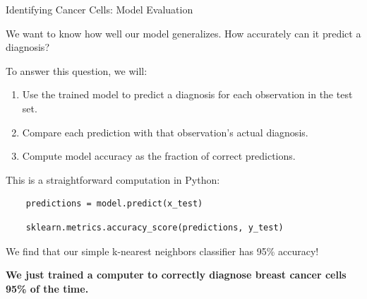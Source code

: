 \documentclass[8pt,aspectratio=169]{beamer}
\begin{document}
\begin{frame}[fragile]{Identifying Cancer Cells: Model Evaluation}

\pause
We want to know how well our model generalizes. How accurately can it predict a diagnosis?

\vspace{3mm}
\pause
To answer this question, we will:

\begin{enumerate}
\pause \item Use the trained model to predict a diagnosis for each observation in the test set.
\pause \item Compare each prediction with that observation's actual diagnosis.
\pause \item Compute model accuracy as the fraction of correct predictions.
\end{enumerate}

\vspace{3mm}
\pause
This is a straightforward computation in Python:

\pause
\begin{verbatim}
    predictions = model.predict(x_test)
\end{verbatim}
\pause
\begin{verbatim}
    sklearn.metrics.accuracy_score(predictions, y_test)
\end{verbatim}

\vspace{3mm}
\pause
We find that our simple k-nearest neighbors classifier has 95\% accuracy!

\vspace{3mm}
\pause
\textbf{We just trained a computer to correctly diagnose breast cancer cells 95\% of the time.}

\end{frame}

\end{document}
